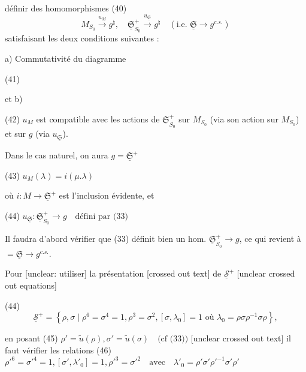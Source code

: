 \newpage


définir des homomorphismes
(40) $$M_{S_0} \xrightarrow{u_M} g^\natural, \quad \underline{\mathfrak{S}}^+_{S_0} \xrightarrow{u_{\underline{\mathfrak{S}}}} g^\natural \quad (\text{i.e. } \underline{\mathfrak{S}} \to g^{c.s.})$$
satisfaisant les deux conditions suivantes :

a) Commutativité du diagramme

(41)

et b)

(42) $u_M$ est compatible avec les actions
de $\underline{\mathfrak{S}}^+_{S_0}$ sur $M_{S_0}$ (via son action sur $M_{S_0}$)
et sur $g$ (via $u_{\underline{\mathfrak{S}}}$).

Dans le cas naturel, on aura $g = \underline{\mathfrak{S}}^+$

(43) $u_M(\lambda) = i(\mu . \lambda)$

où $i : M \longrightarrow \underline{\mathfrak{S}}^+$
est l'inclusion évidente, et

(44) $u_{\underline{\mathfrak{S}}} : \underline{\mathfrak{S}}^+_{S_0} \longrightarrow g \quad \text{défini par (33)}$

Il faudra d'abord vérifier que (33)
définit bien un hom. $\underline{\mathfrak{S}}^+_{S_0} \longrightarrow g$,
ce qui revient à $= \underline{\mathfrak{S}} \to g^{c.s.}$.

\newpage


Pour [unclear: utiliser] la présentation [crossed out text] de $\underline{\mathcal{S}}^+$
[unclear crossed out equations]

(44) $$\underline{\mathcal{S}}^+ = \left\{ \rho, \sigma \mid \rho^6 = \sigma^4 = 1, \rho^3 = \sigma^2, [\sigma, \lambda_0] = 1 \text{ où } \lambda_0 = \rho \sigma \rho^{-1} \sigma \rho \right\},$$

en posant
(45) $\rho' = \tilde{u}(\rho), \sigma' = \tilde{u}(\sigma) \quad \text{(cf (33))}$
[unclear crossed out text]
il faut vérifier les relations
(46) $\rho'^6 = \sigma'^4 = 1, [\sigma', \lambda'_0] = 1, \rho'^3 = \sigma'^2 \quad \text{avec} \quad \lambda'_0 = \rho' \sigma' \rho'^{-1} \sigma' \rho'$

